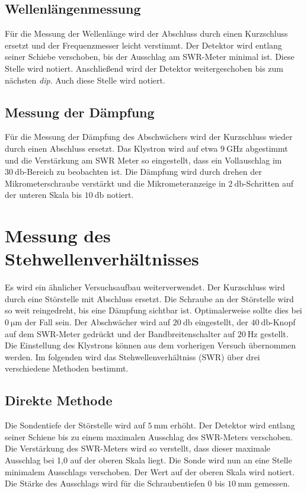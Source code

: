 \subsection{Wellenlängenmessung}
Für die Messung der Wellenlänge wird der Abschluss durch einen Kurzschluss ersetzt und der Frequenzmesser leicht verstimmt. Der Detektor wird entlang seiner Schiebe verschoben, bis der Ausschlag am SWR-Meter minimal ist.
Diese Stelle wird notiert. Anschließend wird der Detektor weitergeschoben bis zum nächsten \textit{dip}. Auch diese Stelle wird notiert.

\subsection{Messung der Dämpfung}
Für die Messung der Dämpfung des Abschwächers wird der Kurzschluss wieder durch einen Abschluss ersetzt. Das Klystron wird auf etwa $\qty{9}{\giga\hertz}$ abgestimmt und die Verstärkung am SWR Meter so eingestellt, dass 
ein Vollauschlag im $\qty{30}{\decibel}$-Bereich zu beobachten ist. Die Dämpfung wird durch drehen der Mikrometerschraube verstärkt und die Mikrometeranzeige in $\qty{2}{\decibel}$-Schritten auf der unteren Skala bis 
$\qty{10}{\decibel}$ notiert.

\section{Messung des Stehwellenverhältnisses}
Es wird ein ähnlicher Versuchsaufbau weiterverwendet. Der Kurzschluss wird durch eine Störstelle mit Abschluss ersetzt. Die Schraube an der Störstelle wird so weit reingedreht, bis eine Dämpfung sichtbar ist. Optimalerweise
sollte dies bei $\qty{0}{\micro\metre}$ der Fall sein. Der Abschwächer wird auf $\qty{20}{\decibel}$ eingestellt, der $\qty{40}{\decibel}$-Knopf
auf dem SWR-Meter gedrückt und der Bandbreitenschalter auf $\qty{20}{\hertz}$ gestellt. Die Einstellung des Klystrons können aus dem vorherigen Versuch übernommen werden. Im folgenden wird das Stehwellenverhältniss (SWR)
über drei verschiedene Methoden bestimmt.

\subsection{Direkte Methode}
Die Sondentiefe der Störstelle wird auf $\qty{5}{\milli\metre}$ erhöht. Der Detektor wird entlang seiner Schiene bis zu einem maximalen Ausschlag des SWR-Meters verschoben. Die Verstärkung des SWR-Meters wird so verstellt,
dass dieser maximale Ausschlag bei 1,0 auf der oberen Skala liegt. Die Sonde wird nun an eine Stelle minimalem Ausschlags verschoben. Der Wert auf der oberen Skala wird notiert. Die Stärke des Ausschlags wird für die Schraubentiefen
$0$ bis $\qty{10}{\milli\metre}$ gemessen.

